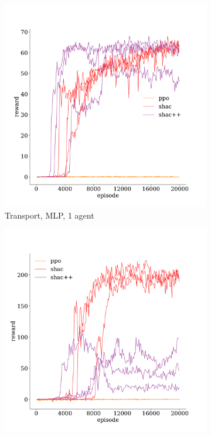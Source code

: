 \begin{figure}[t]
    \begin{subfigure}[b]{0.32\textwidth}
        \includegraphics[width=\textwidth]{figs/transport-1-mlp.pdf}
        \caption{Transport, MLP, 1 agent}
        \label{fig:transport-mlp-1}
    \end{subfigure}
    \begin{subfigure}[b]{0.32\textwidth}
        \includegraphics[width=\textwidth]{figs/transport-3-mlp.pdf}

\end{subfigure}
\end{figure}
